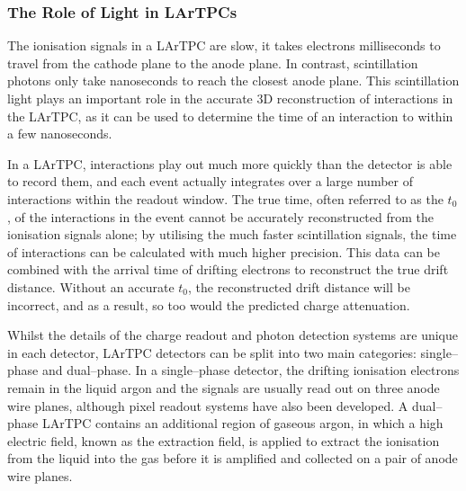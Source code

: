 \subsubsection*{The Role of Light in LArTPCs}

The ionisation signals in a LArTPC are slow, it takes electrons milliseconds to
travel from the cathode plane to the anode plane. In contrast, scintillation 
photons only take nanoseconds to reach the closest anode plane. This 
scintillation light plays an important role in the accurate 3D reconstruction 
of interactions in the LArTPC, as it can be used to determine the time of an 
interaction to within a few nanoseconds.

In a LArTPC, interactions play out much more quickly than the detector is able 
to record them, and each event actually integrates over a large number of 
interactions within the readout window. The true time, often referred to as 
the $t_0$, of the interactions in the event cannot be accurately reconstructed 
from the ionisation signals alone; by utilising the much faster scintillation 
signals, the time of interactions can be calculated with much higher 
precision.  This data can be combined with the arrival time of drifting 
electrons to reconstruct the true drift distance. Without an accurate $t_0$, 
the reconstructed drift distance will be incorrect, and as a result, so too
would the predicted charge attenuation.

Whilst the details of the charge readout and photon detection systems are unique
in each detector, LArTPC detectors can be split into two main categories: 
single--phase and dual--phase. In a single--phase detector, the drifting 
ionisation electrons remain in the liquid argon and the signals are usually 
read out on three anode wire planes, although pixel readout systems have also 
been developed\cite{argoncube}. A dual--phase LArTPC contains an additional 
region of gaseous argon, in which a high electric field, known as the 
extraction field, is applied to extract the ionisation from the liquid into 
the gas before it is amplified and collected on a pair of anode wire 
planes\cite{Abi:2020wmh}.

